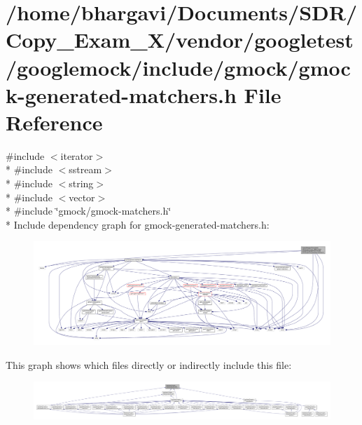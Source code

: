 \hypertarget{gmock-generated-matchers_8h}{}\section{/home/bhargavi/\+Documents/\+S\+D\+R/\+Copy\+\_\+\+Exam\+\_\+X/vendor/googletest/googlemock/include/gmock/gmock-\/generated-\/matchers.h File Reference}
\label{gmock-generated-matchers_8h}
{\ttfamily \#include $<$iterator$>$}\\*
{\ttfamily \#include $<$sstream$>$}\\*
{\ttfamily \#include $<$string$>$}\\*
{\ttfamily \#include $<$vector$>$}\\*
{\ttfamily \#include \char`\"{}gmock/gmock-\/matchers.\+h\char`\"{}}\\*
Include dependency graph for gmock-\/generated-\/matchers.h\+:
\nopagebreak
\begin{figure}[H]
\begin{center}
\leavevmode
\includegraphics[width=350pt]{gmock-generated-matchers_8h__incl}
\end{center}
\end{figure}
This graph shows which files directly or indirectly include this file\+:
\nopagebreak
\begin{figure}[H]
\begin{center}
\leavevmode
\includegraphics[width=350pt]{gmock-generated-matchers_8h__dep__incl}
\end{center}
\end{figure}
